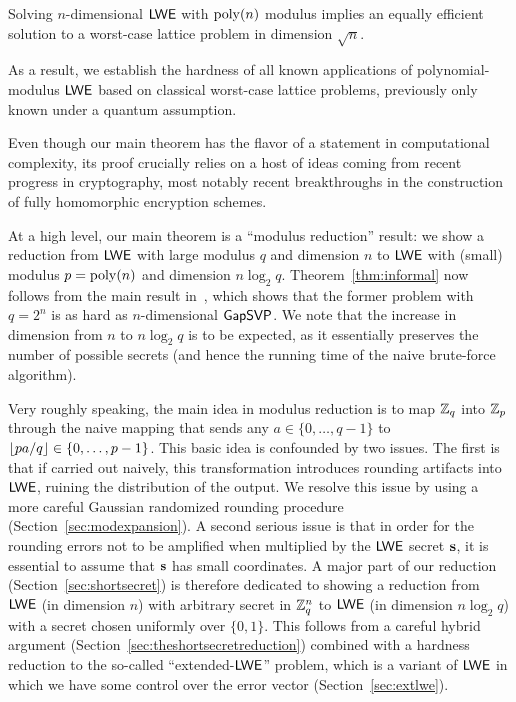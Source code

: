 \begin{theorem}[Informal]\label{thm:informal}
Solving $n$-dimensional $\mathsf{LWE}$ with $\operatorname{poly}(n)$ modulus
implies an equally efficient solution to a worst-case lattice problem in dimension $\sqrt{n}$.
\end{theorem}
%
As a result, we establish the hardness of all known applications of polynomial-modulus $\mathsf{LWE}$ based on
classical worst-case lattice problems, previously only known under a quantum assumption.

Even though our main theorem has the flavor of a statement in computational complexity,
its proof crucially relies on a host of ideas coming from recent progress in cryptography,
most notably recent breakthroughs in the construction of fully homomorphic encryption schemes.

At a high level, our main theorem is a ``modulus reduction'' result:
we show a reduction from $\mathsf{LWE}$ with large modulus $q$ and dimension $n$ to
$\mathsf{LWE}$ with (small) modulus $p=\operatorname{poly}(n)$ and dimension $n \log_2 q$. Theorem~\ref{thm:informal}
now follows from the main result in~\cite{DBLP:conf/stoc/Peikert09}, which shows that
the former problem with $q=2^n$ is as hard as $n$-dimensional $\mathsf{GapSVP}$.
We note that the increase in dimension from $n$ to $n \log_2 q$ is to be expected,
as it essentially preserves the number of possible secrets (and hence the running time
of the naive brute-force algorithm).%

Very roughly speaking,
the main idea in modulus reduction is to map $\mathbb{Z}_q$ into $\mathbb{Z}_p$ through the naive mapping
that sends any $a \in \{0,\ldots,q-1\}$ to $\lfloor pa/q\rfloor \in \{0,\ldots,p-1\}$.
This basic idea is confounded by two issues. The first is that if carried out naively, this
transformation introduces rounding artifacts into $\mathsf{LWE}$, ruining the distribution
of the output. We resolve this issue by using a more careful Gaussian randomized rounding procedure (Section~\ref{sec:modexpansion}).
A second serious issue is that in order for the rounding errors not to be
amplified when multiplied by the $\mathsf{LWE}$ secret $\mathbf{s}$, it is essential to assume that $\mathbf{s}$
has small coordinates. A major part of our reduction (Section~\ref{sec:shortsecret}) is therefore dedicated to showing
a reduction from $\mathsf{LWE}$ (in dimension $n$) with arbitrary secret in $\mathbb{Z}_q^n$ to $\mathsf{LWE}$ (in dimension $n \log_2 q$)
with a secret chosen uniformly over $\{0,1\}$. This follows from a careful hybrid argument (Section~\ref{sec:theshortsecretreduction}) combined with a
hardness reduction to the so-called ``extended-$\mathsf{LWE}$'' problem, which is a variant of $\mathsf{LWE}$ in which we have some control
over the error vector (Section~\ref{sec:extlwe}).


